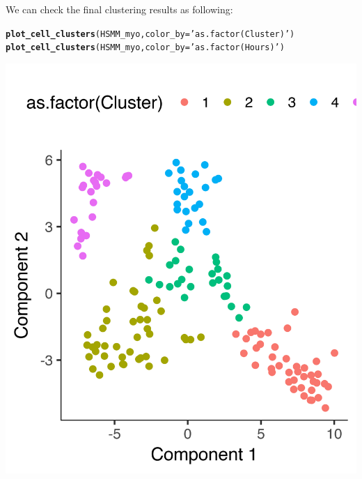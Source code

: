 \documentclass[10pt,oneside]{article}\usepackage[]{graphicx}\usepackage[]{color}
\makeatletter
\def\maxwidth{ %
  \ifdim\Gin@nat@width>\linewidth
    \linewidth
  \else
    \Gin@nat@width
  \fi
}
\newcommand{\hlstr}[1]{\textcolor[rgb]{0.192,0.494,0.8}{#1}}%
\newcommand{\hlstd}[1]{\textcolor[rgb]{0.345,0.345,0.345}{#1}}%
\newcommand{\hlkwc}[1]{\textcolor[rgb]{0.333,0.667,0.333}{#1}}%
\newcommand{\hlkwd}[1]{\textcolor[rgb]{0.737,0.353,0.396}{\textbf{#1}}}%
\newenvironment{kframe}{%
 \def\at@end@of@kframe{}%
 \ifinner\ifhmode%
  \def\at@end@of@kframe{\end{minipage}}%
  \begin{minipage}{\columnwidth}%
 \fi\fi%
 \def\FrameCommand##1{\hskip\@totalleftmargin \hskip-\fboxsep
 \colorbox{shadecolor}{##1}\hskip-\fboxsep
     \hskip-\linewidth \hskip-\@totalleftmargin \hskip\columnwidth}%
 \MakeFramed {\advance\hsize-\width
   \@totalleftmargin\z@ \linewidth\hsize
   \@setminipage}}%
 {\par\unskip\endMakeFramed%
 \at@end@of@kframe}
\newenvironment{knitrout}{}{} %
\makeatother
\begin{document}
We can check the final clustering results as following: 
\begin{knitrout}
\color{fgcolor}\begin{kframe}
\begin{alltt}
\hlkwd{plot_cell_clusters}\hlstd{(HSMM_myo,} \hlkwc{color_by} \hlstd{=} \hlstr{'as.factor(Cluster)'}\hlstd{)}
\hlkwd{plot_cell_clusters}\hlstd{(HSMM_myo,} \hlkwc{color_by} \hlstd{=} \hlstr{'as.factor(Hours)'}\hlstd{)}
\end{alltt}
\end{kframe}
\includegraphics[width=\maxwidth]{figure/check_clustering_again-1} 

\end{knitrout}
\end{document}
